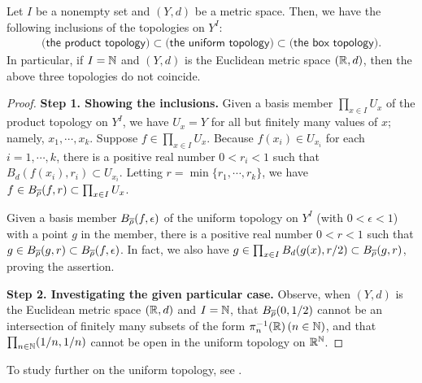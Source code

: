 \begin{prop}
    Let $I$ be a nonempty set and $(Y, d)$ be a metric space.
    Then, we have the following inclusions of the topologies on $Y^I$:
    \begin{align*}
        \textsf{(the product topology)}\subset\textsf{(the uniform topology)}\subset\textsf{(the box topology)}.
    \end{align*}
    In particular, if $I={\mathbb{N}}$ and $(Y, d)$ is the Euclidean metric space $({\mathbb{R}}, d)$, then the above three topologies do not coincide.
\end{prop}
\begin{proof}
    \textbf{Step 1. Showing the inclusions.}\newline\noindent
    Given a basis member $\prod_{x\in I} U_x$ of the product topology on $Y^I$, we have $U_x=Y$ for all but finitely many values of $x$; namely, $x_1, \cdots, x_k$.
    Suppose $f\in \prod_{x\in I} U_x$.
    Because $f(x_i)\in U_{x_i}$ for each $i=1, \cdots, k$, there is a positive real number $0<r_i<1$ such that $B_d(f(x_i), r_i)\subset U_{x_i}$.
    Letting $r=\min\{r_1, \cdots, r_k\}$, we have $f\in B_{\overline{\rho}}(f, r)\subset \prod_{x\in I} U_x$.

    Given a basis member $B_{\overline{\rho}}(f, \epsilon)$ of the uniform topology on $Y^I$ (with $0<\epsilon<1$) with a point $g$ in the member, there is a positive real number $0<r<1$ such that $g\in B_{\overline{\rho}}(g, r)\subset B_{\overline{\rho}}(f, \epsilon)$.
    In fact, we also have $g\in \prod_{x\in I} B_d(g(x), r/2)\subset B_{\overline{\rho}}(g, r)$, proving the assertion.

    \textbf{Step 2. Investigating the given particular case.}\newline\noindent
    Observe, when $(Y, d)$ is the Euclidean metric space $({\mathbb{R}}, d)$ and $I={\mathbb{N}}$, that $B_{\overline{\rho}}(0, 1/2)$ cannot be an intersection of finitely many subsets of the form $\pi_n^{-1}({\mathbb{R}})\, (n\in{\mathbb{N}})$, and that $\prod_{n\in{\mathbb{N}}}(1/n, 1/n)$ cannot be open in the uniform topology on ${\mathbb{R}}^{\mathbb{N}}$.
\end{proof}

To study further on the uniform topology, see .